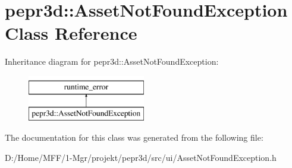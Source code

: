 \hypertarget{classpepr3d_1_1_asset_not_found_exception}{}\section{pepr3d\+::Asset\+Not\+Found\+Exception Class Reference}
\label{classpepr3d_1_1_asset_not_found_exception}
Inheritance diagram for pepr3d\+::Asset\+Not\+Found\+Exception\+:\begin{figure}[H]
\begin{center}
\leavevmode
\includegraphics[height=2.000000cm]{classpepr3d_1_1_asset_not_found_exception}
\end{center}
\end{figure}


The documentation for this class was generated from the following file\+:\begin{DoxyCompactItemize}
\item 
D\+:/\+Home/\+M\+F\+F/1-\/\+Mgr/projekt/pepr3d/src/ui/Asset\+Not\+Found\+Exception.\+h\end{DoxyCompactItemize}
